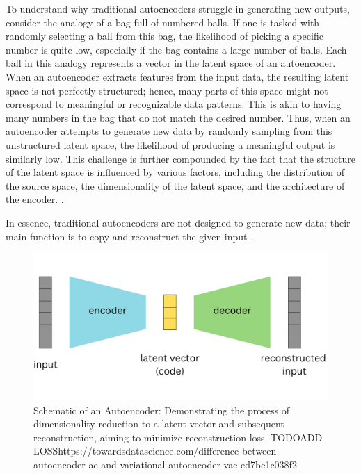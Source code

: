 To understand why traditional autoencoders struggle in generating new outputs, consider the analogy of a bag full of numbered balls. If one is tasked with randomly selecting a ball from this bag, the likelihood of picking a specific number is quite low, especially if the bag contains a large number of balls. Each ball in this analogy represents a vector in the latent space of an autoencoder. When an autoencoder extracts features from the input data, the resulting latent space is not perfectly structured; hence, many parts of this space might not correspond to meaningful or recognizable data patterns. This is akin to having many numbers in the bag that do not match the desired number. Thus, when an autoencoder attempts to generate new data by randomly sampling from this unstructured latent space, the likelihood of producing a meaningful output is similarly low. This challenge is further compounded by the fact that the structure of the latent space is influenced by various factors, including the distribution of the source space, the dimensionality of the latent space, and the architecture of the encoder.
\citep{michelucci2022introduction}.

In essence, traditional autoencoders are not designed to generate new data; their main function is to copy and reconstruct the given input \citep{GoodfellowDeepLearning}.

\begin{figure}[ht]
    \centering
      \hspace{.8cm}
      \includegraphics[width=.7\columnwidth]{figures/Autoencoder.png}
      \caption{Schematic of an Autoencoder: Demonstrating the process of dimensionality reduction to a latent vector and subsequent reconstruction, aiming to minimize reconstruction loss. TODO\@ ADD LOSS\@ https://towardsdatascience.com/difference-between-autoencoder-ae-and-variational-autoencoder-vae-ed7be1c038f2}\label{fig:figureAE}
\end{figure}

